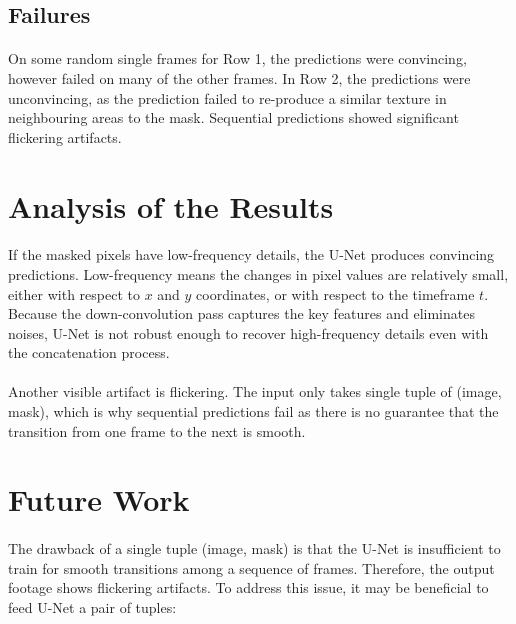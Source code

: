 \documentclass{article}
\begin{document}
\subsection{Failures}
\paragraph{}
On some random single frames for Row 1, the predictions were convincing, however failed on many of the other frames. In Row 2, the predictions were unconvincing, as the prediction failed to re-produce a similar texture in neighbouring areas to the mask. Sequential predictions showed significant flickering artifacts.

\section{Analysis of the Results}
\paragraph{}
If the masked pixels have low-frequency details, the U-Net produces convincing predictions.  Low-frequency means the changes in pixel values are relatively small, either with respect to $x$ and $y$ coordinates, or with respect to the timeframe $t$. Because the down-convolution pass captures the key features and eliminates noises, U-Net is not robust enough to recover high-frequency details even with the concatenation process.
\paragraph{}
Another visible artifact is flickering. The input only takes single tuple of (image, mask), which is why sequential predictions fail as there is no guarantee that the transition from one frame to the next is smooth. 


\section{Future Work}
\paragraph{}
The drawback of a single tuple (image, mask) is that the U-Net is insufficient to train for smooth transitions among a sequence of frames. Therefore, the output footage shows flickering artifacts. To address this issue, it may be beneficial to feed U-Net a pair of tuples: 
\end{document}
